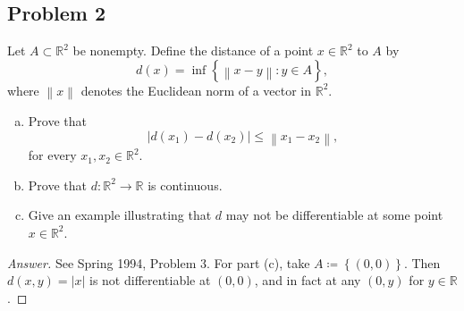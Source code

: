 \documentclass[12pt]{article}
\newcommand{\real}{\mathbb{R}}
\newcommand\paren[1]{\left( #1 \right)}
\newcommand\setb[1]{\left \{ #1 \right \}}
\newcommand{\abs}[1]{\left | #1 \right |}
\newcommand{\norm}[1]{\left\| #1 \right\|}
\theoremstyle{definition}
\begin{document}
\subsection{Problem 2 \texorpdfstring{\cite{Nguyen}}{}}
Let $A \subset \real^2$ be nonempty. Define the distance of a point $x \in \real^2$ to $A$ by 
\[
    d(x) = \inf \setb{ \norm{ x - y } : y \in A },
\]
where $\norm{x}$ denotes the Euclidean norm of a vector in $\real^2$.
\begin{enumerate}[(a)]
    \item Prove that 
    \[
        \abs{ d \paren{ x_1 } - d \paren{ x_2 } } \leq \norm{ x_1 - x_2 },
    \]
    for every $x_1 , x_2 \in \real^2$.
    \item Prove that $d : \real^2 \to \real$ is continuous.
    \item Give an example illustrating that $d$ may not be differentiable at some point $x \in \real^2$.
\end{enumerate}
\begin{proof}[Answer]
    See Spring 1994, Problem 3. For part (c), take $A \coloneqq \setb{ (0,0) }$. Then $d(x,y) = \abs{ x }$ is not differentiable at $(0,0)$, and in fact at any $(0,y)$ for $y \in \real$.
\end{proof}
\end{document}
